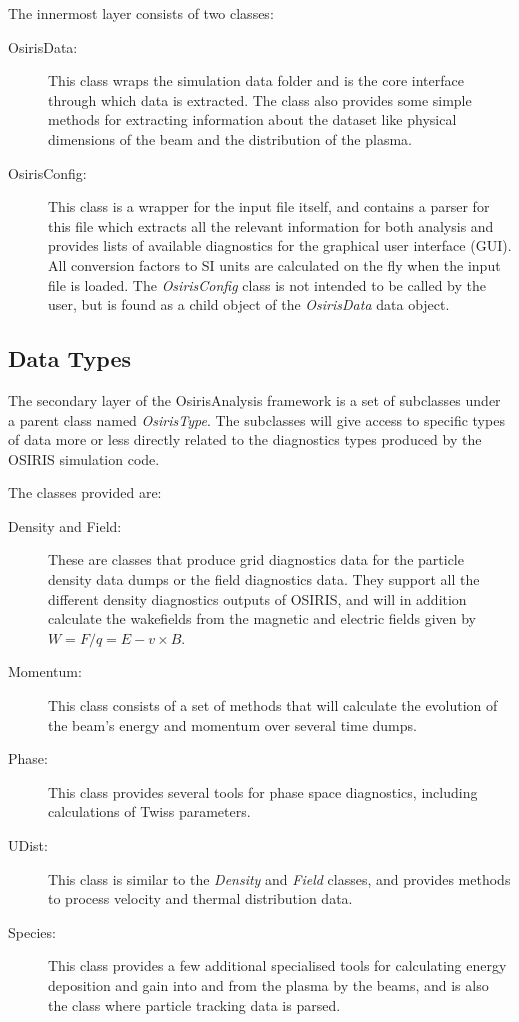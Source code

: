 The innermost layer consists of two classes:

\begin{description}
    \item[OsirisData:] This class wraps the simulation data folder and is the core interface through which data is extracted.
    The class also provides some simple methods for extracting information about the dataset like physical dimensions of the beam and the distribution of the plasma.
    
    \item[OsirisConfig:] This class is a wrapper for the input file itself, and contains a parser for this file which extracts all the relevant information for both analysis and provides lists of available diagnostics for the graphical user interface (GUI).
    All conversion factors to SI units are calculated on the fly when the input file is loaded.
    The \emph{OsirisConfig} class is not intended to be called by the user, but is found as a child object of the \emph{OsirisData} data object.
\end{description}

\subsection{Data Types}
\label{Tools:OALay2}

The secondary layer of the OsirisAnalysis framework is a set of subclasses under a parent class named \emph{OsirisType}.
The subclasses will give access to specific types of data more or less directly related to the diagnostics types produced by the OSIRIS simulation code.

The classes provided are:

\begin{description}
    \item[Density and Field:] These are classes that produce grid diagnostics data for the particle density data dumps or the field diagnostics data.
    They support all the different density diagnostics outputs of OSIRIS, and will in addition calculate the wakefields from the magnetic and electric fields given by $W = F/q = E - v \times B$.
    \item[Momentum:] This class consists of a set of methods that will calculate the evolution of the beam's energy and momentum over several time dumps.
    \item[Phase:] This class provides several tools for phase space diagnostics, including calculations of Twiss parameters.
    \item[UDist:] This class is similar to the \emph{Density} and \emph{Field} classes, and provides methods to process velocity and thermal distribution data.
    \item[Species:] This class provides a few additional specialised tools for calculating energy deposition and gain into and from the plasma by the beams, and is also the class where particle tracking data is parsed.
\end{description}

